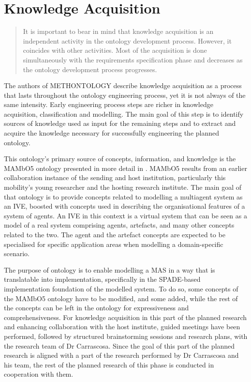 \chapter{Knowledge Acquisition}\label{ch:Knowledge Acquisition}


\blockquote[{{\cite[p. 37]{fernandez-lopez1997METHONTOLOGYOntologicalArt}}}]{It is important to bear in mind that knowledge acquisition is an independent activity in the ontology development process. However, it coincides with other activities. \textelp{} Most of the acquisition is done simultaneously with the requirements specification phase and decreases as the ontology development process progresses.}

The authors of METHONTOLOGY describe knowledge acquisition as a process that lasts throughout the ontology engineering process, yet it is not always of the same intensity. Early engineering process steps are richer in knowledge acquisition, classification and modelling. The main goal of this step is to identify sources of knowledge used as input for the remaining steps and to extract and acquire the knowledge necessary for successfully engineering the planned ontology.

This ontology's primary source of concepts, information, and knowledge is the MAMbO5 ontology presented in more detail in \cite{okresaduric2019MAMbO5NewOntology}. MAMbO5 results from an earlier collaboration instance of the sending and host institution, particularly this mobility's young researcher and the hosting research institute. The main goal of that ontology is to provide concepts related to modelling a multiagent system as an \ac{IVE}, boosted with concepts used in describing the organisational features of a system of agents. An \ac{IVE} in this context is a virtual system that can be seen as a model of a real system comprising agents, artefacts, and many other concepts related to the two. The agent and the artefact concepts are expected to be specialised for specific application areas when modelling a domain-specific scenario.

The purpose of \magoontologyname ontology is to enable modelling a \ac{MAS} in a way that is translatable into implementation, specifically in the SPADE-based implementation foundation of the modelled system. To do so, some concepts of the MAMbO5 ontology have to be modified, and some added, while the rest of the concepts can be left in the ontology for expressiveness and comprehensiveness. For knowledge acquisition in this part of the planned research and enhancing collaboration with the host institute, guided meetings have been performed, followed by structured brainstorming sessions and research plans, with the research team of Dr Carrascosa. Since the goal of this part of the planned research is aligned with a part of the research performed by Dr Carrascosa and his team, the rest of the planned research of this phase is conducted in cooperation with them.

